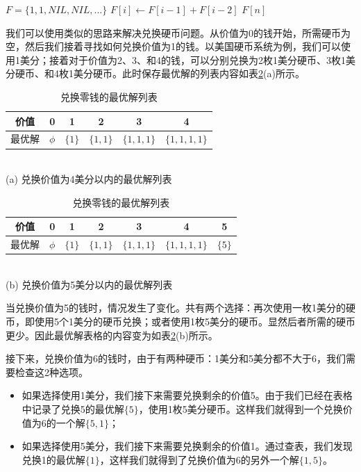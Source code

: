 \documentclass[b5paper]{ctexart}
\begin{document}
\begin{algorithmic}[1]
  \State $F = \{1, 1, NIL, NIL, ...\}$
    \State $F[i] \gets F[i-1] + F[i-2]$
  \EndFor
  \State \Return $F[n]$
\EndFunction
\end{algorithmic}

我们可以使用类似的思路来解决兑换硬币问题。从价值为0的钱开始，所需硬币为空，然后我们接着寻找如何兑换价值为1的钱。以美国硬币系统为例，我们可以使用1美分；接着对于价值为2、3、和4的钱，可以分别兑换为2枚1美分硬币、3枚1美分硬币、和4枚1美分硬币。此时保存最优解的列表内容如表\ref{tab:change-money}(a)所示。

\begin{table}[htbp]
\centering
\begin{tabular}{c||c|c|c|c|c|}
\hline
价值 & 0 & 1 & 2 & 3 & 4 \\
\hline
最优解 & $\phi$ & $\{1\}$ & $\{1, 1\}$ & $\{1, 1, 1\}$ & $\{1, 1, 1, 1\}$ \\
\hline
\end{tabular} \\
(a) 兑换价值为4美分以内的最优解列表 \\
\vspace{10pt}
\begin{tabular}{c||c|c|c|c|c|c|}
\hline
价值 & 0 & 1 & 2 & 3 & 4 & 5 \\
\hline
最优解 & $\phi$ & $\{1\}$ & $\{1, 1\}$ & $\{1, 1, 1\}$ & $\{1, 1, 1, 1\}$ & $\{ 5 \}$ \\
\hline
\end{tabular} \\
(b) 兑换价值为5美分以内的最优解列表 \\
\caption{兑换零钱的最优解列表} \label{tab:change-money}
\end{table}

当兑换价值为5的钱时，情况发生了变化。共有两个选择：再次使用一枚1美分的硬币，即使用5个1美分的硬币兑换；或者使用1枚5美分的硬币。显然后者所需的硬币更少。因此最优解表格的内容变为如表\ref{tab:change-money}(b)所示。

接下来，兑换价值为6的钱时，由于有两种硬币：1美分和5美分都不大于6，我们需要检查这2种选项。

\begin{itemize}
\item 如果选择使用1美分，我们接下来需要兑换剩余的价值5。由于我们已经在表格中记录了兑换5的最优解$\{ 5 \}$，使用1枚5美分硬币。这样我们就得到一个兑换价值为6的一个解$\{5, 1\}$；
\item 如果选择使用5美分，我们接下来需要兑换剩余的价值1。通过查表，我们发现兑换1的最优解$\{ 1 \}$，这样我们就得到了兑换价值为6的另外一个解$\{1, 5\}$。
\end{itemize}
\end{document}
